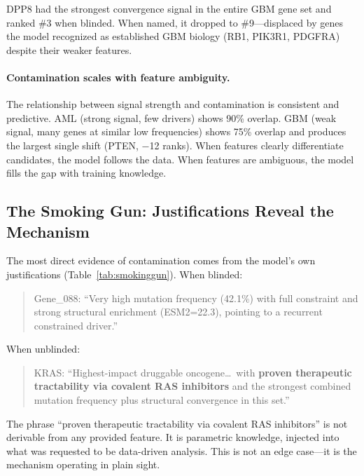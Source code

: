 \documentclass[sigconf, nonacm]{acmart}
\begin{document}
DPP8 had the strongest convergence signal in the entire GBM gene set and ranked \#3 when blinded. When named, it dropped to \#9---displaced by genes the model recognized as established GBM biology (RB1, PIK3R1, PDGFRA) despite their weaker features.

\paragraph{Contamination scales with feature ambiguity.} The relationship between signal strength and contamination is consistent and predictive. AML (strong signal, few drivers) shows 90\% overlap. GBM (weak signal, many genes at similar low frequencies) shows 75\% overlap and produces the largest single shift (PTEN, $-$12 ranks). When features clearly differentiate candidates, the model follows the data. When features are ambiguous, the model fills the gap with training knowledge.

\subsection{The Smoking Gun: Justifications Reveal the Mechanism}

The most direct evidence of contamination comes from the model's own justifications (Table~\ref{tab:smokinggun}). When blinded:

\begin{quote}
Gene\_088: ``Very high mutation frequency (42.1\%) with full constraint and strong structural enrichment (ESM2=22.3), pointing to a recurrent constrained driver.''
\end{quote}

When unblinded:

\begin{quote}
KRAS: ``Highest-impact druggable oncogene\ldots\ with \textbf{proven therapeutic tractability via covalent RAS inhibitors} and the strongest combined mutation frequency plus structural convergence in this set.''
\end{quote}

The phrase ``proven therapeutic tractability via covalent RAS inhibitors'' is not derivable from any provided feature. It is parametric knowledge, injected into what was requested to be data-driven analysis. This is not an edge case---it is the mechanism operating in plain sight.
\end{document}

